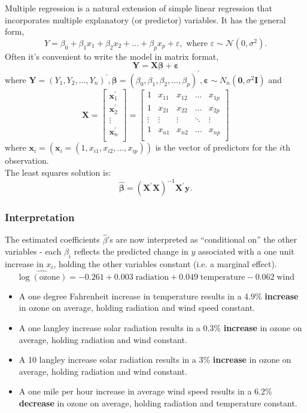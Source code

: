 \documentclass[a4paper]{article}\usepackage[]{graphicx}\usepackage[]{xcolor}
\begin{document}
Multiple regression is a natural extension of simple linear regression that incorporates multiple explanatory (or predictor) variables. It has the general form,
\[
	Y = \beta_0 + \beta_1 x_1 + \beta_2 x_2 + \ldots + \beta_p x_p + \varepsilon, \text { where }\varepsilon\sim \mathcal{N}(0,\sigma^2).
\]
Often it's convenient to write the model in matrix format,
\[
	\symbf{Y} = \symbf{X} \symbf{\beta} + \symbf{\varepsilon}
\]
where \( \symbf{Y} = (Y_1,Y_2,\dotsc,Y_n)^\prime, \symbf{\beta} = (\beta_0,\beta_1,\beta_2,\dotsc,\beta_p)^\prime, \symbf{\varepsilon} \sim N_n(\textbf{0},\sigma^2 \symbf{I}) \) and
\[
	\symbf{X} = 
	\begin{bmatrix}
		\symbf{x}_1^\prime \\
		\symbf{x}_2^\prime \\
		\vdots \\
		\symbf{x}_n^\prime \\
	\end{bmatrix}
	=
	\begin{bmatrix}
		1 & x_{11} & x_{12} & \hdots & x_{1p} \\
		1 & x_{21} & x_{22} & \hdots & x_{2p} \\
		\vdots & \vdots & \vdots & \ddots & \vdots \\
		1 & x_{n1} & x_{n2} & \hdots & x_{np} \\
	\end{bmatrix}
\]
where \( \symbf{x}_i = (\symbf{x}_i = (1, x_{i1}, x_{i2}, \dotsc, x_{ip})) \) is the vector of predictors for the \( i \)th observation.\\
The least squares solution is:
\[
	\hat{\symbf{\beta}} = (\symbf{X}^\prime \symbf{X})^{-1} \symbf{X}^\prime \symbf{y}.
\]
\subsubsection{Interpretation}
The estimated coefficients \( \hat{\beta} \)'s are now interpreted as ``conditional on'' the other variables - each \( \beta_i \) reflects the predicted change in \( y \) associated with a one unit increase in \( x_i \), holding the other variables constant (i.e. a marginal effect).
\[
	\widehat{\log(\text{ozone})} = -0.261 + 0.003\; \text{radiation} + 0.049\; \text{temperature} - 0.062\; \text{wind}
\]
\begin{itemize}
	\item A one degree Fahrenheit increase in temperature results in a 4.9\% \textbf{increase} in ozone on average, holding radiation and wind speed constant.
	\item A one langley increase solar radiation results in a 0.3\% \textbf{increase} in ozone on average, holding radiation and wind constant.
	\item A 10 langley increase solar radiation results in a 3\% \textbf{increase} in ozone on average, holding radiation and wind constant.
	\item A one mile per hour increase in average wind speed results in a 6.2\% \textbf{decrease} in ozone on average, holding radiation and temperature constant.
\end{itemize}
\end{document}
